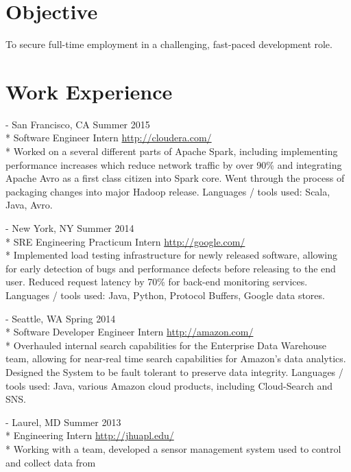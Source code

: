 \documentclass[a4paper,margin,line]{resume}
\newcommand{\rurl}[1]{\hfill {\footnotesize \url{#1}}}
\newcommand{\rdate}[1]{\hfill {\small #1}}
\renewcommand{\employer}[5]{ \item[#1] - #2 \rdate{#3} \\* #4 \rurl{#5} \\*}
\begin{document}
\begin{resume}
\section{\mysidestyle Objective}
    To secure full-time employment in a challenging, fast-paced development role.
\section{\mysidestyle Work Experience}
	\begin{asparadesc}
        \employer{Cloudera}{San Francisco, CA}{Summer 2015}{Software Engineer Intern}
        {http://cloudera.com/}
        \small
        Worked on a several different parts of Apache Spark, including implementing performance
        increases which reduce network traffic by over 90\% and integrating Apache
        Avro as a first class citizen into Spark core. Went through the process of packaging
        changes into major Hadoop release. Languages / tools used: 
        Scala, Java, Avro.
        \normalsize
        \\
        \employer{Google}{New York, NY}{Summer 2014}{SRE Engineering Practicum Intern}
        {http://google.com/}
		\small
        Implemented load testing infrastructure for newly released software,
        allowing for early detection of bugs and performance defects before
        releasing to the end user. Reduced request latency by 70\% for 
        back-end monitoring services. Languages / tools used: Java, Python, 
        Protocol Buffers, Google data stores.
		\normalsize
		\\
		\employer{Amazon}{Seattle, WA}{Spring 2014}{Software Developer Engineer Intern}
        {http://amazon.com/}
		\small
	    Overhauled internal search capabilities for the Enterprise Data Warehouse
        team, allowing for near-real time search capabilities for Amazon's data
        analytics. Designed the System to be fault tolerant to preserve data integrity.
        Languages / tools used: Java, various Amazon cloud products, including Cloud-Search
        and SNS.
        \normalsize
		\\
		\employer{John Hopkins University Applied Physics Lab}{Laurel, MD}
        {Summer 2013}{Engineering Intern}{http://jhuapl.edu/}
		\small
		Working with a team, developed a sensor management system used to control and collect data from

\end{asparadesc}
\end{resume}
\end{document}
